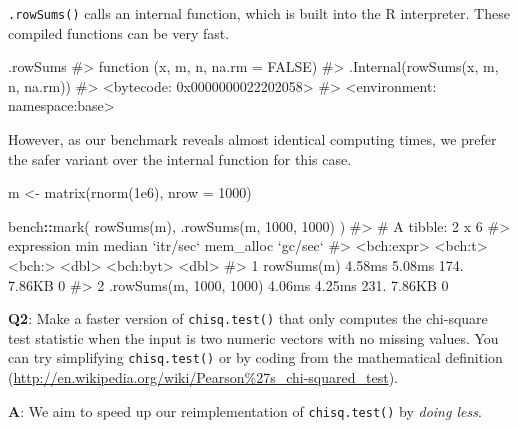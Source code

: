 \documentclass[
]{krantz}
\makeatletter
\newenvironment{Shaded}{\begin{snugshade}}{\end{snugshade}}
\newcommand{\CommentTok}[1]{\textcolor[rgb]{0.56,0.35,0.01}{\textit{#1}}}
\newcommand{\DataTypeTok}[1]{\textcolor[rgb]{0.13,0.29,0.53}{#1}}
\newcommand{\DecValTok}[1]{\textcolor[rgb]{0.00,0.00,0.81}{#1}}
\newcommand{\FloatTok}[1]{\textcolor[rgb]{0.00,0.00,0.81}{#1}}
\newcommand{\KeywordTok}[1]{\textcolor[rgb]{0.13,0.29,0.53}{\textbf{#1}}}
\newcommand{\NormalTok}[1]{#1}
\newcommand{\OperatorTok}[1]{\textcolor[rgb]{0.81,0.36,0.00}{\textbf{#1}}}
\newcommand{\StringTok}[1]{\textcolor[rgb]{0.31,0.60,0.02}{#1}}
\renewcommand{\href}[2]{#2 (\url{#1})}
\newenvironment{kframe}{%
\medskip{}
\setlength{\fboxsep}{.8em}
 \def\at@end@of@kframe{}%
 \ifinner\ifhmode%
  \def\at@end@of@kframe{\end{minipage}}%
  \begin{minipage}{\columnwidth}%
 \fi\fi%
 \def\FrameCommand##1{\hskip\@totalleftmargin \hskip-\fboxsep
 \colorbox{shadecolor}{##1}\hskip-\fboxsep
     \hskip-\linewidth \hskip-\@totalleftmargin \hskip\columnwidth}%
 \MakeFramed {\advance\hsize-\width
   \@totalleftmargin\z@ \linewidth\hsize
   \@setminipage}}%
 {\par\unskip\endMakeFramed%
 \at@end@of@kframe}
\renewenvironment{Shaded}{\begin{kframe}}{\end{kframe}}
\renewcommand{\KeywordTok} [1]{\textcolor[rgb]{0.00,0.44,0.13}{{#1}}}
\renewcommand{\DataTypeTok}[1]{\textcolor[rgb]{0.56,0.13,0.00}{{#1}}}
\renewcommand{\DecValTok}  [1]{\textcolor[rgb]{0.25,0.63,0.44}{{#1}}}
\renewcommand{\FloatTok}   [1]{\textcolor[rgb]{0.25,0.63,0.44}{{#1}}}
\renewcommand{\StringTok}  [1]{\textcolor[rgb]{0.25,0.44,0.63}{{#1}}}
\renewcommand{\CommentTok} [1]{\textcolor[rgb]{0.38,0.63,0.69}{{#1}}}
\renewcommand{\NormalTok}  [1]{{#1}}
\makeatother
\begin{document}
\texttt{.rowSums()} calls an internal function, which is built into the R interpreter. These compiled functions can be very fast.

\begin{Shaded}
\begin{Highlighting}[]
\NormalTok{.rowSums}
\CommentTok{#> function (x, m, n, na.rm = FALSE) }
\CommentTok{#> .Internal(rowSums(x, m, n, na.rm))}
\CommentTok{#> <bytecode: 0x0000000022202058>}
\CommentTok{#> <environment: namespace:base>}
\end{Highlighting}
\end{Shaded}

However, as our benchmark reveals almost identical computing times, we prefer the safer variant over the internal function for this case.

\begin{Shaded}
\begin{Highlighting}[]
\NormalTok{m <-}\StringTok{ }\KeywordTok{matrix}\NormalTok{(}\KeywordTok{rnorm}\NormalTok{(}\FloatTok{1e6}\NormalTok{), }\DataTypeTok{nrow =} \DecValTok{1000}\NormalTok{)}

\NormalTok{bench}\OperatorTok{::}\KeywordTok{mark}\NormalTok{(}
  \KeywordTok{rowSums}\NormalTok{(m),}
  \KeywordTok{.rowSums}\NormalTok{(m, }\DecValTok{1000}\NormalTok{, }\DecValTok{1000}\NormalTok{)}
\NormalTok{)}
\CommentTok{#> # A tibble: 2 x 6}
\CommentTok{#>   expression                  min median `itr/sec` mem_alloc `gc/sec`}
\CommentTok{#>   <bch:expr>              <bch:t> <bch:>     <dbl> <bch:byt>    <dbl>}
\CommentTok{#> 1 rowSums(m)               4.58ms 5.08ms      174.    7.86KB        0}
\CommentTok{#> 2 .rowSums(m, 1000, 1000)  4.06ms 4.25ms      231.    7.86KB        0}
\end{Highlighting}
\end{Shaded}

\textbf{{Q2}}: Make a faster version of \texttt{chisq.test()} that only computes the chi-square test statistic when the input is two numeric vectors with no missing values. You can try simplifying \texttt{chisq.test()} or by coding from the \href{http://en.wikipedia.org/wiki/Pearson\%27s_chi-squared_test}{mathematical definition}.

\textbf{{A}}: We aim to speed up our reimplementation of \texttt{chisq.test()} by \emph{doing less}.
\end{document}
